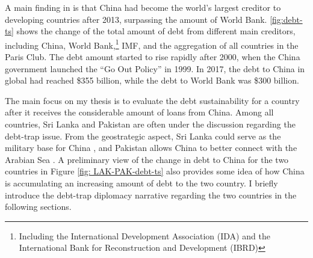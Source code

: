 A main finding in \citet*{Horn-Reinhart-Trebesch-21} is that China had become the world's largest creditor to developing countries after 2013, surpassing the amount of World Bank. \autoref{fig:debt-ts} shows the change of the total amount of debt from different main creditors, including China, World Bank,\footnote{Including the International Development Association (IDA) and the International Bank for Reconstruction and Development (IBRD) } IMF, and the aggregation of all countries in the Paris Club. The debt amount started to rise rapidly after 2000, when the China government launched the ``Go Out Policy'' in 1999. In 2017, the debt to China in global had reached \$355 billion, while the debt to World Bank was \$300 billion.

The main focus on my thesis is to evaluate the debt sustainability for a country after it receives the considerable amount of loans from China. Among all countries, Sri Lanka and Pakistan are often under the discussion regarding the debt-trap issue. From the geostrategic aspect, Sri Lanka could serve as the military base for China \citep{Chellaney_2017}, and Pakistan allows China to better connect with the Arabian Sea \citep{Hurley19-8-debt-trap}. A preliminary view of the change in debt to China for the two countries in Figure \ref{fig: LAK-PAK-debt-ts} also provides some idea of how China is accumulating an increasing amount of debt to the two country. I briefly introduce the debt-trap diplomacy narrative regarding the two countries in the following sections.